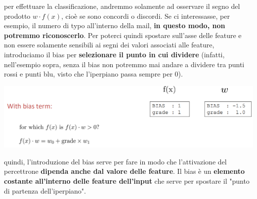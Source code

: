 \documentclass[12pt]{article}
\begin{document}
per effettuare la classificazione, andremmo solamente ad osservare il segno del prodotto $w \cdot f(x)$, cioè se sono concordi o discordi.
Se ci interessasse, per esempio, il numero di typo all'interno della mail, \textbf{in questo modo, non potremmo riconoscerlo}.
Per poterci quindi spostare sull'asse delle feature e non essere solamente sensibili ai segni dei valori associati alle feature, introduciamo il bias per \textbf{selezionare il punto in cui dividere} (infatti, nell'esempio sopra, senza il bias non potremmo mai andare a dividere tra punti rossi e punti blu, visto che l'iperpiano passa sempre per 0).
\begin{center}
    \includegraphics[width =1\linewidth]{Images/93.PNG}
\end{center}
quindi, l'introduzione del bias serve per fare in modo che l'attivazione del percettrone \textbf{dipenda anche dal valore delle feature}.
Il bias è un \textbf{elemento costante all'interno delle feature dell'input} che serve per spostare il "punto di partenza dell'iperpiano".
\end{document}
